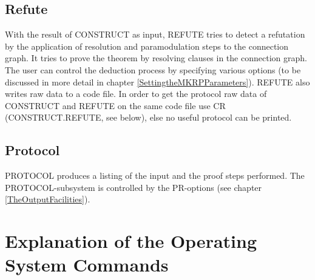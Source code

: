 \subsection{Refute}

With the result of CONSTRUCT as input, REFUTE tries to detect a
refutation by the application of resolution and paramodulation steps
to the connection graph. It tries to prove the theorem by resolving
clauses in the connection graph. The user can control the deduction
process by specifying various options (to be discussed in more detail
in chapter \ref{SettingtheMKRPParameters}).  REFUTE also writes raw
data to a code file. In order to get the protocol raw data of
CONSTRUCT and REFUTE on the same code file use CR (CONSTRUCT.REFUTE,
see below), else no useful protocol can be printed.

\subsection{Protocol}

PROTOCOL produces a listing of the input and the proof steps
performed. The PROTOCOL-subsystem is controlled by the PR-options (see
chapter \ref{TheOutputFacilities}).

\section {Explanation of the Operating System Commands}
\label {ExplanationoftheOperatingSystemCommands}

